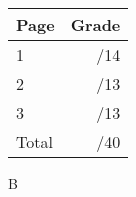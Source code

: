 \documentclass[12pt]{article}
\newcommand{\skipline}{\vspace{12pt}}
\begin{document}
\begin{table}[hbt]
\begin{center}
\begin{tabular}{|l|r|} \hline
Page&Grade\\
\hline \hline
\cline{1-2} 1 & \enspace\enspace\enspace\enspace\enspace\enspace/14\\
\cline{1-2} 2 & \enspace\enspace\enspace\enspace\enspace\enspace/13\\
\cline{1-2} 3 & \enspace\enspace\enspace\enspace\enspace\enspace/13\\
\cline{1-2} Total & \enspace\enspace\enspace\enspace\enspace\enspace/40\\
\hline
\end{tabular}

\skipline

\skipline

\skipline

B
\end{center}
\end{table}
\newpage
\end{document}
